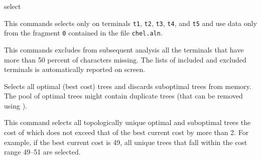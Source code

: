 \begin{command}{select}{}
	\begin{poyexamples}
        
        
            {This commands selects only on terminals \texttt{t1},  \texttt{t2},
             \texttt{t3},  \texttt{t4}, and  \texttt{t5} and use data only from the
              fragment  \texttt{0} contained in the file \texttt{chel.aln}.}
	
	{This commands excludes from subsequent analysis all the terminals that
	have more than 50 percent of characters missing. The lists of included and excluded
	terminals is automatically reported on screen.}
	
            {Selects all optimal (best cost) trees and discards suboptimal trees from
            memory. The pool of optimal trees might contain duplicate trees (that can
            be removed using ).}
            
	{This command selects all topologically unique optimal and suboptimal trees
	the cost of which does not exceed that of the best current cost by more than
	2. For example, if the best current cost is 49, all unique trees that fall within
	the cost range 49--51 are selected.}
	
	\end{poyexamples}

	\begin{poyalso}
	\end{poyalso}

\end{command}

